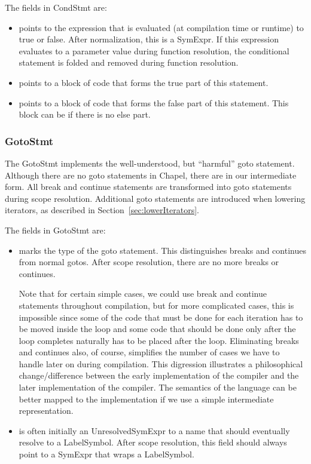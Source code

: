 \documentclass[10pt]{article}
\begin{document}
The fields in CondStmt are:
\begin{itemize}
\item {} points to the expression that is evaluated
  (at compilation time or runtime) to true or false.  After
  normalization, this is a SymExpr.  If this expression evaluates to a
  parameter value during function resolution, the conditional
  statement is folded and removed during function resolution.
\item {} points to a block of code that forms
  the true part of this statement.
\item {} points to a block of code that forms
  the false part of this statement.  This block can be  if
  there is no else part.
\end{itemize}

\subsubsection{GotoStmt}
\label{sec:gotostmt}

The GotoStmt implements the well-understood, but ``harmful'' goto
statement.  Although there are no goto statements in Chapel, there are
in our intermediate form.  All break and continue statements are
transformed into goto statements during scope resolution.  Additional
goto statements are introduced when lowering iterators, as described in
Section~\ref{sec:lowerIterators}.

The fields in GotoStmt are:
\begin{itemize}
\item {} marks the type of the goto statement.  This
  distinguishes breaks and continues from normal gotos.  After scope
  resolution, there are no more breaks or continues.

  Note that for
  certain simple cases, we could use break and continue statements
  throughout compilation, but for more complicated cases, this is
  impossible since some of the code that must be done for each
  iteration has to be moved inside the loop and some code that should
  be done only after the loop completes naturally has to be placed
  after the loop.  Eliminating breaks and continues also, of course,
  simplifies the number of cases we have to handle later on during
  compilation.  This digression illustrates a philosophical
  change/difference between the early implementation of the compiler
  and the later implementation of the compiler.  The semantics of the
  language can be better mapped to the implementation if we use a
  simple intermediate representation.
\item {} is often initially an UnresolvedSymExpr to a
  name that should eventually resolve to a LabelSymbol.  After scope
  resolution, this field should always point to a SymExpr that wraps a
  LabelSymbol.
\end{itemize}
\end{document}
